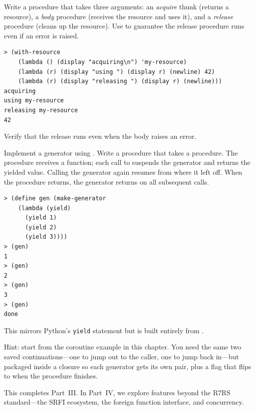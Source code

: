 \begin{exercise}
Write a  procedure that takes three arguments: an \emph{acquire} thunk (returns a resource), a \emph{body} procedure (receives the resource and uses it), and a \emph{release} procedure (cleans up the resource). Use  to guarantee the release procedure runs even if an error is raised.

\begin{lstlisting}[style=repl]
> (with-resource
    (lambda () (display "acquiring\n") 'my-resource)
    (lambda (r) (display "using ") (display r) (newline) 42)
    (lambda (r) (display "releasing ") (display r) (newline)))
acquiring
using my-resource
releasing my-resource
42
\end{lstlisting}

Verify that the release runs even when the body raises an error.
\end{exercise}

\begin{exercise}
Implement a generator using . Write a  procedure that takes a procedure. The procedure receives a  function; each call to  suspends the generator and returns the yielded value. Calling the generator again resumes from where it left off. When the procedure returns, the generator returns  on all subsequent calls.

\begin{lstlisting}[style=repl]
> (define gen (make-generator
    (lambda (yield)
      (yield 1)
      (yield 2)
      (yield 3))))
> (gen)
1
> (gen)
2
> (gen)
3
> (gen)
done
\end{lstlisting}

This mirrors Python's \texttt{yield} statement but is built entirely from .

Hint: start from the coroutine example in this chapter. You need the same two saved continuations---one to jump out to the caller, one to jump back in---but packaged inside a closure so each generator gets its own pair, plus a flag that flips to  when the procedure finishes.
\end{exercise}

This completes Part~III. In Part~IV, we explore features beyond the R7RS standard---the SRFI ecosystem, the foreign function interface, and concurrency.

\chapterend
